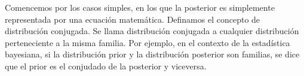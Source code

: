 \documentclass[a4paper,twoside]{article}
\begin{document}
Comencemos por los casos simples, en los que la posterior es simplemente representada por una
ecuación matemática. Definamos el concepto de distribución conjugada. Se llama distribución
conjugada a cualquier distribución perteneciente a la misma familia. Por ejemplo, en el contexto de
la estadística bayesiana, si la distribución prior y la distribución posterior son familias, se dice
que el prior es el conjudado de la posterior y viceversa.
\end{document}
